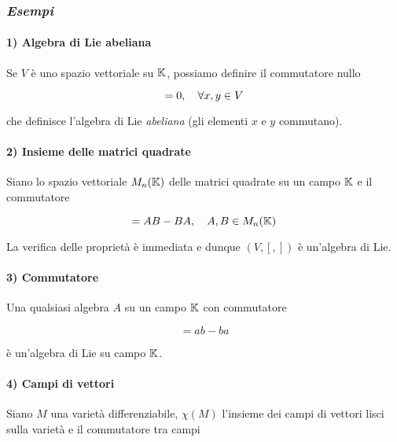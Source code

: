 \subsubsection{\textit{Esempi}}

\paragraph{1) Algebra di Lie abeliana}

Se $ V $ è uno spazio vettoriale su $ \mathbb{K} $, possiamo definire il commutatore nullo

\begin{equation}
	[x,y] = 0 \qcomma \forall x,y \in V
\end{equation}

che definisce l'algebra di Lie \textit{abeliana} (gli elementi $ x $ e $ y $ commutano).

\paragraph{2) Insieme delle matrici quadrate}

Siano lo spazio vettoriale $ M_{n}(\mathbb{K}) $ delle matrici quadrate su un campo $ \mathbb{K} $ e il commutatore

\begin{equation}
	[A,B] = AB - BA \qcomma A,B \in M_{n}(\K)
\end{equation}

La verifica delle proprietà è immediata e dunque $ (V,[,]) $ è un'algebra di Lie.

\paragraph{3) Commutatore}

Una qualsiasi algebra $ A $ su un campo $ \mathbb{K} $ con commutatore

\begin{equation}
	[a,b] = ab - ba
\end{equation}

è un'algebra di Lie su campo $ \mathbb{K} $.

\paragraph{4) Campi di vettori}

Siano $ M $ una varietà differenziabile, $ \chi(M) $ l'insieme dei campi di vettori lisci sulla varietà e il commutatore tra campi

